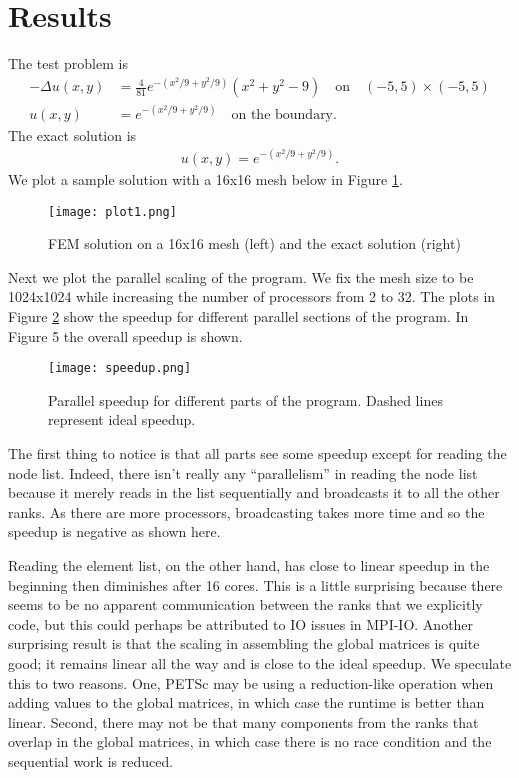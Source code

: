 \documentclass[12pt,notitlepage]{extreport}
\begin{document}
\section*{Results}
The test problem is
\begin{align}
  -\Delta u(x,y) &= \frac{4}{81}e^{-(x^2/9+y^2/9)}(x^2 + y^2 - 9) \quad \text{on} \quad (-5,5) \times (-5,5) \\
  u(x,y) &= e^{-(x^2/9 + y^2/9)} \quad \text{on the boundary}.
\end{align}
The exact solution is
\begin{align}
  u(x,y) = e^{-(x^2/9 + y^2/9)}.
\end{align}
We plot a sample solution with a  16x16 mesh below in Figure \ref{fig:plot}.

\begin{figure}[h]
  \centering
  \texttt{[image: plot1.png]}

  \caption{FEM solution on a 16x16 mesh (left) and the exact solution (right)}
  \label{fig:plot}
\end{figure}
Next we plot the parallel scaling of the program. We fix the mesh size to be 1024x1024 while increasing the number of processors from 2 to 32. The plots in Figure \ref{fig:speedup} show the speedup for different parallel sections of the program. In Figure 5 the overall speedup is shown.
\begin{figure}[h]
  \centering
  \texttt{[image: speedup.png]}

  \caption{Parallel speedup for different parts of the program. Dashed lines represent ideal speedup.}
  \label{fig:speedup}
\end{figure}

The first thing to notice is that all parts see some speedup except for reading the node list. Indeed, there isn't really any ``parallelism'' in reading the node list because it merely reads in the list sequentially and broadcasts it to all the other ranks. As there are more processors, broadcasting takes more time and so the speedup is negative as shown here.

Reading the element list, on the other hand, has close to linear speedup in the beginning then diminishes after 16 cores. This is a little surprising because there seems to be no apparent communication between the ranks that we explicitly code, but this could perhaps be attributed to IO issues in MPI-IO. Another surprising result is that the scaling in assembling the global matrices is quite good; it remains linear all the way and is close to the ideal speedup. We speculate this to two reasons. One, PETSc may be using a reduction-like operation when adding values to the global matrices, in which case the runtime is better than linear. Second, there may not be that many components from the ranks that overlap in the global matrices, in which case there is no race condition and the sequential work is reduced.
\end{document}
